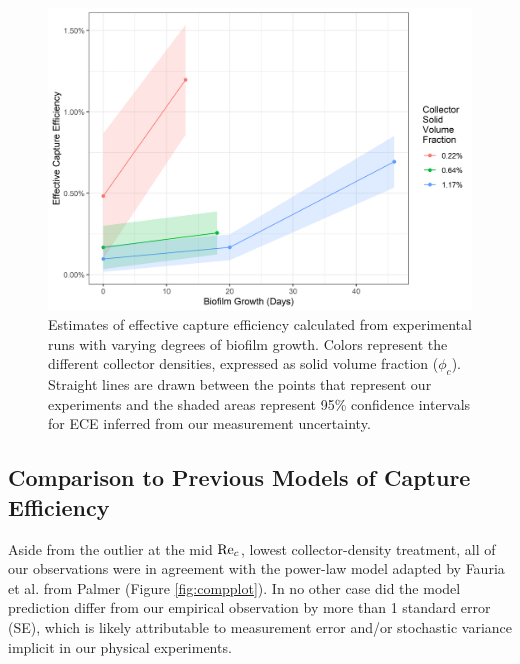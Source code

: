 \documentclass[geosciences,article,submit,moreauthors,pdftex]{Definitions/mdpi}
\begin{document}
\begin{figure}[h]
\centering
\includegraphics[width=5in]{../pics/biofilm.png}
\caption{Estimates of effective capture efficiency calculated from experimental runs with varying degrees of biofilm growth. Colors represent the different collector densities, expressed as solid volume fraction ($\phi_c$). Straight lines are drawn between the points that represent our experiments and the shaded areas represent 95\% confidence intervals for ECE inferred from our measurement uncertainty.}
\label{fig:biofilm}
\end{figure}   

\subsection{Comparison to Previous Models of Capture Efficiency}

Aside from the outlier at the mid $\mathrm{Re}_c$, lowest collector-density treatment, all of our observations were in agreement with the power-law model adapted by Fauria et al. \cite{Fauria_2015} from Palmer \cite{Palmer_2004} (Figure \ref{fig:compplot}). In no other case did the model prediction differ from our empirical observation by more than 1 standard error (SE), which is likely attributable to measurement error and/or stochastic variance implicit in our physical experiments.
\end{document}

